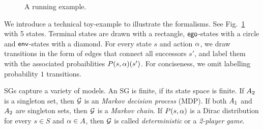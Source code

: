 \begin{figure}
\centering
{}	
\caption{A running example. }
\label{fig:toysg}
\end{figure}
\begin{example}
	We introduce a technical toy-example to illustrate the formalisms. See Fig.~\ref{fig:toysg} with 5 states. Terminal states are drawn with a rectangle, $\mathsf{ego}$-states with a circle and $\mathsf{env}$-states with a diamond. For every state $s$ and action $\alpha$, we draw transitions in the form of edges that connect all successors $s'$, and label them with the associated probaiblities $P(s,\alpha)(s')$. For conciseness, we omit labelling probability $1$ transitions.\end{example}
	
SGs capture a variety of models.
An SG is finite, if its state space is finite.
If $A_2$ is a singleton set, then $\mathcal{G}$ is an \emph{Markov decision process} (MDP).
If both $A_1$ and $A_2$ are singleton sets, then $\mathcal{G}$ is a \emph{Markov chain}. If $P(s,\alpha)$ is a Dirac distribution for every $s \in S$ and $\alpha \in A$, then $\mathcal{G}$ is called \emph{deterministic} or a \emph{2-player game}.


